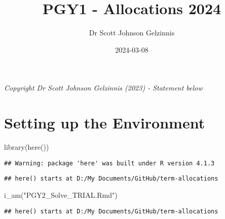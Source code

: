 \documentclass[
]{article}
\title{PGY1 - Allocations 2024}
\author{Dr Scott Johnson Gelzinnis}
\date{2024-03-08}
\newenvironment{Shaded}{\begin{snugshade}}{\end{snugshade}}
\newcommand{\FunctionTok}[1]{\textcolor[rgb]{0.00,0.00,0.00}{#1}}
\newcommand{\NormalTok}[1]{#1}
\newcommand{\StringTok}[1]{\textcolor[rgb]{0.31,0.60,0.02}{#1}}
\begin{document}
\maketitle

\emph{Copyright Dr Scott Johnson Gelzinnis (2023) - Statement below}

\hypertarget{setting-up-the-environment}{%
\section{Setting up the Environment}\label{setting-up-the-environment}}

\begin{Shaded}
\begin{Highlighting}[]
\FunctionTok{library}\NormalTok{(}\FunctionTok{here}\NormalTok{())}
\end{Highlighting}
\end{Shaded}

\begin{verbatim}
## Warning: package 'here' was built under R version 4.1.3
\end{verbatim}

\begin{verbatim}
## here() starts at D:/My Documents/GitHub/term-allocations
\end{verbatim}

\begin{Shaded}
\begin{Highlighting}[]
\FunctionTok{i\_am}\NormalTok{(}\StringTok{"PGY2\_Solve\_TRIAL.Rmd"}\NormalTok{)}
\end{Highlighting}
\end{Shaded}

\begin{verbatim}
## here() starts at D:/My Documents/GitHub/term-allocations
\end{verbatim}
\end{document}
